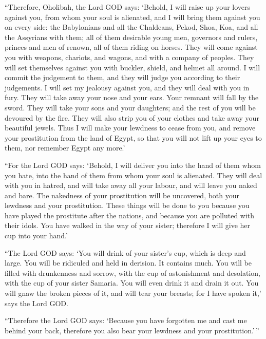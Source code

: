  ``Therefore, Oholibah, the Lord GOD says: `Behold, I
will raise up your lovers against you, from whom your soul is alienated,
and I will bring them against you on every side:  the
Babylonians and all the Chaldeans, Pekod, Shoa, Koa, and all the
Assyrians with them; all of them desirable young men, governors and
rulers, princes and men of renown, all of them riding on horses.
 They will come against you with weapons, chariots, and
wagons, and with a company of peoples. They will set themselves against
you with buckler, shield, and helmet all around. I will commit the
judgement to them, and they will judge you according to their
judgements.  I will set my jealousy against you, and they
will deal with you in fury. They will take away your nose and your ears.
Your remnant will fall by the sword. They will take your sons and your
daughters; and the rest of you will be devoured by the fire.
 They will also strip you of your clothes and take away
your beautiful jewels.  Thus I will make your lewdness to
cease from you, and remove your prostitution from the land of Egypt, so
that you will not lift up your eyes to them, nor remember Egypt any
more.'

 ``For the Lord GOD says: `Behold, I will deliver you
into the hand of them whom you hate, into the hand of them from whom
your soul is alienated.  They will deal with you in
hatred, and will take away all your labour, and will leave you naked and
bare. The nakedness of your prostitution will be uncovered, both your
lewdness and your prostitution.  These things will be
done to you because you have played the prostitute after the nations,
and because you are polluted with their idols.  You have
walked in the way of your sister; therefore I will give her cup into
your hand.'

 ``The Lord GOD says: `You will drink of your sister's
cup, which is deep and large. You will be ridiculed and held in
derision. It contains much.  You will be filled with
drunkenness and sorrow, with the cup of astonishment and desolation,
with the cup of your sister Samaria.  You will even drink
it and drain it out. You will gnaw the broken pieces of it, and will
tear your breasts; for I have spoken it,' says the Lord GOD.

 ``Therefore the Lord GOD says: `Because you have
forgotten me and cast me behind your back, therefore you also bear your
lewdness and your prostitution.'\,''

